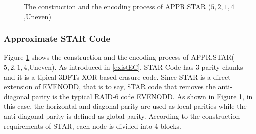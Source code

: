 \documentclass[sigconf]{acmart}
\begin{document}
\begin{figure}[ht]
\caption{The construction and the encoding process of APPR.STAR ($5,2,1,4$,Uneven)}
\label{fig-appr-star}
\end{figure}


\subsubsection{Approximate STAR Code}
Figure \ref{fig-appr-star} shows the construction and the encoding process of APPR.STAR($5,2,1,4$,Uneven).
As introduced in \ref{existEC}, STAR Code \cite{STAR} has 3 parity chunks and it is a tipical 3DFTs XOR-based erasure code.
Since STAR is a direct extension of EVENODD\cite{EVENODD}, that is to say, STAR code that removes the anti-diagonal parity is the typical RAID-6 code EVENODD. As shown in Figure \ref{fig-appr-star}, in this case, the horizontal and diagonal parity are used as local parities while the anti-diagonal parity is defined as global parity.
According to the construction requirements of STAR, each node is divided into 4 blocks.
\end{document}
